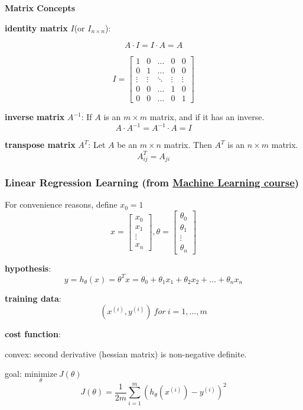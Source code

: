 \documentclass{article}
\begin{document}
\textbf{Matrix Concepts}

\textbf{identity matrix} \(I\)(or \(I_{n \times n}\)):

\[A \cdot I = I \cdot A = A\]

\[
I = 
\begin{bmatrix}
1 & 0 & \dots & 0 & 0\\
0 & 1 & \dots & 0 & 0\\
\vdots & \vdots & \ddots & \vdots & \vdots\\
0 & 0 & \dots & 1 & 0\\
0 & 0 & \dots & 0 & 1
\end{bmatrix}
\]

\textbf{inverse matrix} \(A^{-1}\): If \(A\) is an \(m \times m\) matrix, and if it has an inverse.
\[A \cdot A^{-1} = A^{-1} \cdot A = I\]

\textbf{transpose matrix} \(A^{T}\): Let \(A\) be an \(m \times n\) matrix. Then \(A^T\) is an \(n \times m\) matrix.
\[A^T_{ij} = A_{ji}\]

\subsubsection{Linear Regression Learning (from \href{https://www.coursera.org/learn/machine-learning}{Machine Learning course})}

For convenience reasons, define \(x_0 = 1\)
\[
x = 
\begin{bmatrix}
x_0\\
x_1\\
\vdots\\
x_n
\end{bmatrix}
,
\theta = 
\begin{bmatrix}
\theta_0\\
\theta_1\\
\vdots\\
\theta_n
\end{bmatrix}
\]

\textbf{hypothesis}:
\[y = h_{\theta}(x) = \theta^T x = \theta_0 + \theta_1 x_1 + \theta_2 x_2 + \dots + \theta_n x_n\]

\textbf{training data}:
\[(x^{(i)}, y^{(i)})\:for\:i = 1, \dots, m\]

\textbf{cost function}:

convex: second derivative (hessian matrix) is non-negative definite.

goal: \(\underset{\theta}{\text{minimize}} \: J(\theta)\)
\[J(\theta) = \frac{1}{2m} \sum_{i = 1}^m (h_{\theta}(x^{(i)}) - y^{(i)})^2\]
\end{document}
